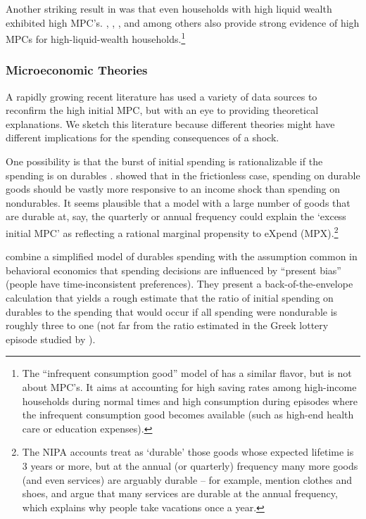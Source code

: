 \documentclass[\econtexRoot/HAFiscal]{subfiles}
\begin{document}
Another striking result in \cite{fagereng_mpc_2021} was that even households with high liquid wealth exhibited high MPC's.  \cite{boehm2025fivefacts}, \cite{graham2024mental}, \cite{crawley2023MicroMacro}, and \cite{kueng2018excess} among others also provide strong evidence of high MPCs for high-liquid-wealth households.\footnote{The ``infrequent consumption good'' model of \cite{melcangiStock} has a similar flavor, but is not about MPC's.  It aims at accounting for high saving rates among high-income households during normal times and high consumption during episodes where the infrequent consumption good becomes available (such as high-end health care or education expenses).}

\hypertarget{microeconomic-theories}{}
\subsubsection{Microeconomic Theories}
A rapidly growing recent literature has used a variety of data sources to reconfirm the high initial MPC, but with an eye to providing theoretical explanations. We sketch this literature because different theories might have different implications for the spending consequences of a shock.


One possibility is that the burst of initial spending is rationalizable if the spending is on durables \citep{bcShocksStocks}.  
\cite{mankiw:durgoods} showed that in the frictionless case, spending on durable goods should be vastly more responsive to an income shock than spending on nondurables. 
It seems plausible that a model with a large number of goods that are durable at, say, the quarterly or annual frequency could explain the `excess initial MPC' as reflecting a rational marginal propensity to eXpend (MPX).\footnote{The NIPA accounts treat as `durable' those goods whose expected lifetime is 3 years or more, but at the annual (or quarterly) frequency many more goods (and even services) are arguably durable -- for example, \cite{bdTimeSeriesC} mention clothes and shoes, and \cite{hkpMemorable} argue that many services are durable at the annual frequency, which explains why people take vacations once a year.}

\cite{lmmPresentBias} combine a simplified model of durables spending with the assumption common in behavioral economics that spending decisions are influenced by ``present bias'' (people have time-inconsistent preferences).  They present a back-of-the-envelope calculation that yields a rough estimate that the ratio of initial spending on durables to the spending that would occur if all spending were nondurable is roughly three to one (not far from the ratio estimated in the Greek lottery episode studied by \cite{kotsogiannisMPCs}).
\end{document}
